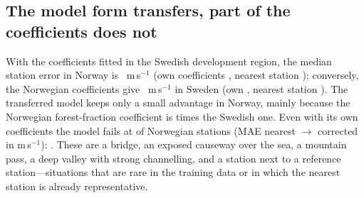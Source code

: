 \subsection{The model form transfers, part of the coefficients does not}
\label{sec:res-transfer}
With the coefficients fitted in the Swedish development region, the median station error in Norway is \noWithSe~m\,s$^{-1}$ (own coefficients \noCvMed, nearest station \noCvRaw); conversely, the Norwegian coefficients give \seWithNo~m\,s$^{-1}$ in Sweden (own \seCvMed, nearest station \seCvRaw). The transferred model keeps only a small advantage in Norway, mainly because the Norwegian forest-fraction coefficient is \noFarRatio{} times the Swedish one. Even with its own coefficients the model fails at \noWorseN{} of \noTrv{} Norwegian stations (MAE nearest $\rightarrow$ corrected in m\,s$^{-1}$): \noWorseList. These are a bridge, an exposed causeway over the sea, a mountain pass, a deep valley with strong channelling, and a station next to a reference station---situations that are rare in the training data or in which the nearest station is already representative.
